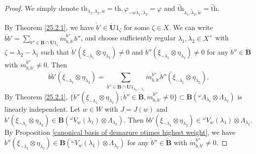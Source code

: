 \documentclass[10pt,a4paper]{amsart}
\def\L{\Lambda}
\def\l{\lambda}
\begin{document}
\begin{proof}
We simply denote $\mathrm{th}_{\lambda_1,\lambda_2,w}=\mathrm{th},\varphi_{-w\lambda_1,\lambda_2}=\varphi$ and $\widetilde{\mathrm{th}}_{\tilde{\lambda}_1,\tilde{\lambda}_2,\tilde{w}}=\widetilde{\mathrm{th}}$.

By Theorem \ref{25.2.1}, we have $\dot{b}' \in \dot{\mathbf{U}}1_{\zeta}$ for some $\zeta\in X$. We can write $\dot{b}\dot{b}'=\sum_{\dot{b}''\in \dot{\mathbf{B}}\cap \dot{\mathbf{U}}1_{\zeta}}\dot{m}_{\dot{b},\dot{b}'}^{\dot{b}''}\dot{b}''$, and choose sufficiently regular $\l_1, \l_2 \in X^+$ with $\zeta=\l_2-\l_1$ such that $\dot{b}'(\xi_{-\lambda_1}\otimes \eta_{\lambda_2})\neq 0$ and $\dot{b}''(\xi_{-\lambda_1}\otimes \eta_{\lambda_2})\neq 0$ for any $\dot{b}'' \in \dot{\mathbf{B}}$ with $\dot{m}_{\dot{b},\dot{b}'}^{\dot{b}''}\neq 0$. Then 
\begin{equation}\label{structure constant m dot}
\dot{b}\dot{b}'(\xi_{-\lambda_1}\otimes \eta_{\lambda_2})=\sum_{\dot{b}''\in \dot{\mathbf{B}}\cap \dot{\mathbf{U}}1_{\lambda_2-\lambda_1}}\dot{m}_{\dot{b},\dot{b}'}^{\dot{b}''}\dot{b}''(\xi_{-\lambda_1}\otimes \eta_{\lambda_2}).    
\end{equation} 
By Theorem \ref{25.2.1}, $\{\dot{b}''(\xi_{-\lambda_1}\otimes \eta_{\lambda_2});\dot{b}'' \in \dot{\mathbf{B}},\dot{m}_{\dot{b},\dot{b}'}^{\dot{b}''}\neq 0\}\subset \mathbf{B}(^{\omega} \L_{\l_1} \otimes \L_{\l_2})$ is linearly independent. Let $w \in W$ with $J=J(w)$ and $\dot{b}'(\xi_{-\lambda_1}\otimes \eta_{\lambda_2})\in \mathbf{B}({^{\omega}V_w(\lambda_1)}\otimes \Lambda_{\lambda_2})$. Then $\dot{b}\dot{b}'(\xi_{-\lambda_1}\otimes \eta_{\lambda_2})\in {^{\omega}V_w(\lambda_1)}\otimes \Lambda_{\lambda_2}$. By Proposition \ref{canonical basis of demazure otimes highest weight}, we have $\dot{b}''(\xi_{-\lambda_1}\otimes \eta_{\lambda_2})\in \mathbf{B}({^{\omega}V_w(\lambda_1)}\otimes \Lambda_{\lambda_2})$ for any $\dot{b}'' \in \dot{\mathbf{B}}$ with $\dot{m}_{\dot{b},\dot{b}'}^{\dot{b}''}\neq 0$. 


\end{proof}
\end{document}
